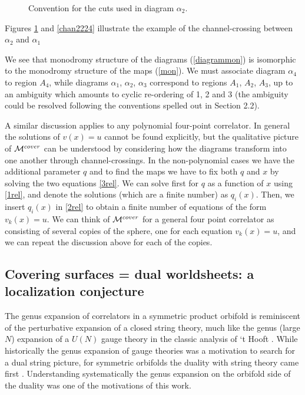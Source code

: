 \documentclass[letterpaper]{JHEP3}
\def\a{\alpha}
\def\a{\alpha}
\begin{document}
 \begin{figure}[htbp]
\begin{center}
\caption{Convention for the cuts used in diagram $\a_2$.} \label{conven}
\end{center}
\end{figure} 	
Figures \ref{conven} and \ref{chan2224} illustrate the example of the channel-crossing between $\alpha_2$ and $\alpha_1$

We see that monodromy structure of the diagrams  (\ref{diagrammon}) is isomorphic to the monodromy structure of the maps (\ref{mon}).
 We must associate diagram $\alpha_4$ to region $A_4$, while diagrams $\alpha_1$, $\alpha_2$, $\alpha_3$ correspond
to regions $A_1$, $A_2$, $A_3$, up to an ambiguity which amounts to cyclic re-ordering of 1, 2 and 3 (the ambiguity could be
resolved following the conventions spelled out in Section 2.2).


A similar discussion applies to any polynomial  four-point correlator. In general the solutions of $v(x)=u$ cannot be found explicitly,
but the qualitative picture of ${\cal M}^{cover}$ can be understood by considering how the diagrams transform into one another through
channel-crossings. In the non-polynomial cases we have the additional parameter $q$ and to find the maps we have to fix both $q$
and $x$ by solving the two equations \eqref{3rel}. We can solve first for $q$ as a function of $x$ using \eqref{1rel}, and denote the solutions (which are a finite number)
as $q_i(x)$. Then, we insert  $q_i(x)$ in \eqref{2rel}  to obtain a finite number of equations
 of the form $v_k (x) = u$. We can think of
 ${\cal M}^{cover}$ for a general four point correlator as 
 consisting of several copies of the sphere, one for each equation $v_k (x) = u$,
 and we can repeat the discussion
above for each of the copies.


\subsection{Covering surfaces = dual worldsheets: a localization conjecture}


The genus expansion of correlators in a symmetric product orbifold is reminiscent
of the perturbative expansion of a closed string theory,  much like the genus (large $N$) expansion of a $U(N)$ gauge theory in the classic  analysis of `t Hooft \cite{'tHooft:1973jz}.
While historically the genus expansion of gauge theories was a motivation to search
for a dual string picture, for symmetric orbifolds 
 the duality with string theory came first \cite{Maldacena:1997re}.
Understanding systematically the genus expansion on the orbifold side of the duality was one of the motivations of this work.
\end{document}
